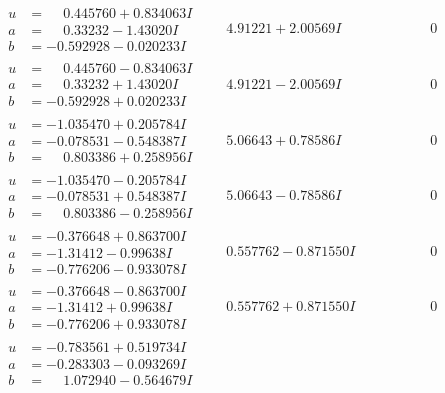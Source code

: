 \documentclass[1p]{elsarticle_modified}
\theoremstyle{definition}
\begin{document}
$$\begin{array}{c|c|c}
\begin{aligned}
u &= \phantom{-}0.445760 + 0.834063 I \\
a &= \phantom{-}0.33232 - 1.43020 I \\
b &= -0.592928 - 0.020233 I\end{aligned}
 & \phantom{-}4.91221 + 2.00569 I & \phantom{-0.000000 } 0 \\ \hline\begin{aligned}
u &= \phantom{-}0.445760 - 0.834063 I \\
a &= \phantom{-}0.33232 + 1.43020 I \\
b &= -0.592928 + 0.020233 I\end{aligned}
 & \phantom{-}4.91221 - 2.00569 I & \phantom{-0.000000 } 0 \\ \hline\begin{aligned}
u &= -1.035470 + 0.205784 I \\
a &= -0.078531 - 0.548387 I \\
b &= \phantom{-}0.803386 + 0.258956 I\end{aligned}
 & \phantom{-}5.06643 + 0.78586 I & \phantom{-0.000000 } 0 \\ \hline\begin{aligned}
u &= -1.035470 - 0.205784 I \\
a &= -0.078531 + 0.548387 I \\
b &= \phantom{-}0.803386 - 0.258956 I\end{aligned}
 & \phantom{-}5.06643 - 0.78586 I & \phantom{-0.000000 } 0 \\ \hline\begin{aligned}
u &= -0.376648 + 0.863700 I \\
a &= -1.31412 - 0.99638 I \\
b &= -0.776206 - 0.933078 I\end{aligned}
 & \phantom{-}0.557762 - 0.871550 I & \phantom{-0.000000 } 0 \\ \hline\begin{aligned}
u &= -0.376648 - 0.863700 I \\
a &= -1.31412 + 0.99638 I \\
b &= -0.776206 + 0.933078 I\end{aligned}
 & \phantom{-}0.557762 + 0.871550 I & \phantom{-0.000000 } 0 \\ \hline\begin{aligned}
u &= -0.783561 + 0.519734 I \\
a &= -0.283303 - 0.093269 I \\
b &= \phantom{-}1.072940 - 0.564679 I\end{aligned}

\end{array}$$
\end{document}
